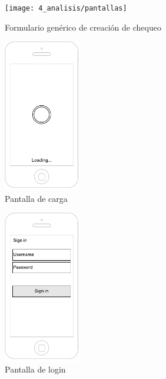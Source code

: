\begin{figure}[htbp]
  \centering
  \texttt{[image: 4\_analisis/pantallas]}
  \caption{Formulario genérico de creación de chequeo}
  \label{fig:pnewcheck}
\end{figure}



\begin{figure}[htbp]
  \centering
  \includegraphics[width=0.3\textwidth]{4_analisis/android_loading}
  \caption{Pantalla de carga}
  \label{fig:aloading}
\end{figure}

\begin{figure}[htbp]
  \centering
  \includegraphics[width=0.3\textwidth]{4_analisis/android_login}
  \caption{Pantalla de login}
  \label{fig:alogin}
\end{figure}

